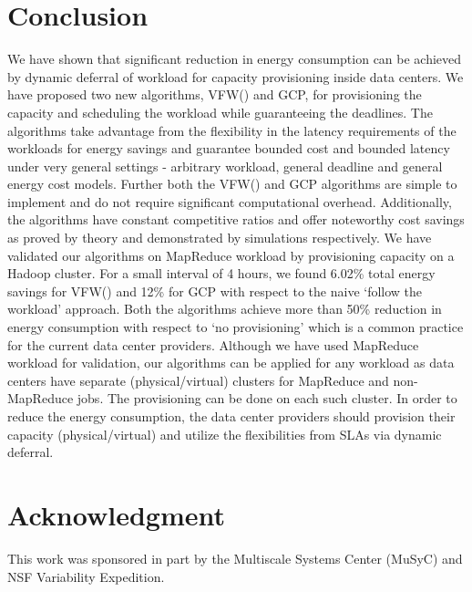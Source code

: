 \documentclass[10pt,conference,compsocconf,letterpaper]{IEEEtran}
\begin{document}
\section{Conclusion}
We have shown that significant reduction in energy consumption can be achieved by dynamic deferral of workload for capacity provisioning inside data centers. We have proposed two new algorithms, VFW() and GCP, for provisioning the capacity and scheduling the workload while guaranteeing the deadlines. The algorithms take advantage from the flexibility in the latency requirements of the workloads for energy savings and guarantee bounded cost and bounded latency under very general settings - arbitrary workload, general deadline and general energy cost models. Further both the VFW() and GCP algorithms are simple to implement and do not require significant computational overhead. Additionally, the algorithms have constant competitive ratios and offer noteworthy cost savings as proved by theory and demonstrated by simulations respectively. We have validated our algorithms on MapReduce workload by provisioning capacity on a Hadoop cluster. For a small interval of 4 hours, we found 6.02\% total energy savings for VFW() and 12\% for GCP with respect to the naive `follow the workload' approach. Both the algorithms achieve more than 50\% reduction in energy consumption with respect to `no provisioning' which is a common practice for the current data center providers. Although we have used MapReduce workload for validation, our algorithms can be applied for any workload as data centers have separate (physical/virtual) clusters for MapReduce and non-MapReduce jobs. The provisioning can be done on each such cluster. In order to reduce the energy consumption, the data center providers should provision their capacity (physical/virtual) and utilize the flexibilities from SLAs via dynamic deferral.





\section*{Acknowledgment}
This work was sponsored in part by the Multiscale Systems
Center (MuSyC) and NSF Variability Expedition.
\end{document}
